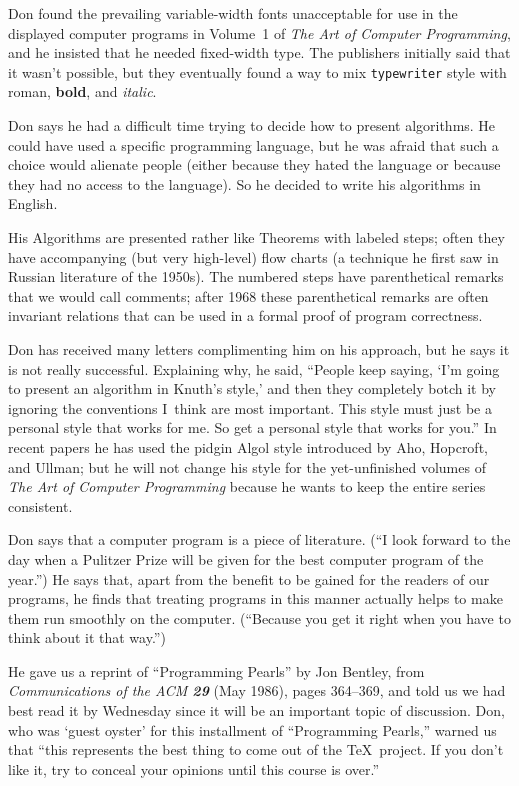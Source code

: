 Don found the prevailing variable-width fonts unacceptable for use in the
displayed computer programs in Volume~1 of {\sl The Art of Computer
Programming},  and he insisted that he needed fixed-width type. The publishers
initially said that it wasn't possible, but they eventually found a way to
mix {\tt typewriter} style with roman, {\bf bold}, and {\it italic}.

Don says he had a difficult time trying to
decide how to present algorithms.  He could have used a specific
programming language, but he was afraid that such a choice would alienate
people (either because they hated the language or because they had no
access to the language). So he decided to write his algorithms in English.

His Algorithms are presented rather like
Theorems with labeled steps; often they
have accompanying (but very high-level)
flow charts (a technique he first saw in Russian
literature of the 1950s).  The numbered steps have parenthetical remarks
that we would call comments; after 1968 these parenthetical remarks are often
invariant relations
 that can be used in a formal proof of program
correctness.

Don has received many letters complimenting him on his approach, but he
says it is not really successful. 
Explaining why, he said, ``People keep saying,
`I'm going to present an algorithm in Knuth's style,' and then they 
completely botch it by ignoring the conventions I~think are most important.
This style must just be a personal style that works
for me.  So get a personal style that works for you.''  In recent papers he has
used the pidgin Algol style introduced by Aho,
Hopcroft,  and Ullman; but he will
not change his style for the yet-unfinished volumes of {\sl The Art of
Computer Programming\/} because he wants to keep the entire series
consistent.

Don says that a computer program is a piece of literature. (``I look forward to the
day when a Pulitzer Prize will be given for the best computer program of 
the year.'')  He
says that, apart from the benefit to be gained for the readers of our
programs, he finds that treating programs in this manner actually helps
to make them  run smoothly on the computer. (``Because you get it
right when you have to think about it that way.'') 

He gave us a reprint of ``Programming Pearls'' by Jon Bentley, from
{\sl Communications of the ACM\/ \bf29} (May 1986), pages 364--369,
and told us we had best read it by Wednesday since it will be an important
topic of discussion.  Don, who was `guest oyster' for this installment of
``Programming Pearls,'' warned us that ``this represents the best thing to
come out of the \TeX\ project.  If you don't like it, try to conceal your
opinions until this course is over.''


